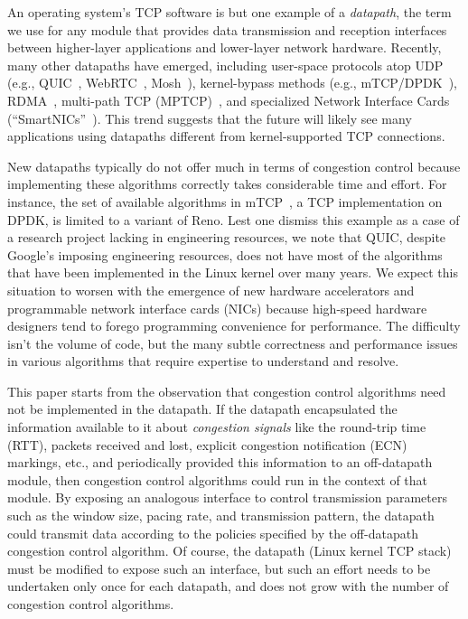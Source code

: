 An operating system's TCP software is but one example of a {\em datapath}, the term we use for any module that provides data transmission and reception interfaces between higher-layer applications and lower-layer network hardware. Recently, many other datapaths have emerged, including user-space protocols atop UDP (e.g., QUIC~\cite{quic}, WebRTC~\cite{webrtc}, Mosh~\cite{mosh}), kernel-bypass methods (e.g., mTCP/DPDK~\cite{dpdk,mtcp,netmap}), RDMA~\cite{dcqcn}, multi-path TCP (MPTCP)~\cite{mptcp}, and specialized Network Interface Cards (``SmartNICs''~\cite{smartnic}). This trend suggests that the future will likely see many applications using datapaths different from kernel-supported TCP connections.

New datapaths typically do not offer much in terms of congestion control because implementing these algorithms correctly takes considerable time and effort. For instance, the set of available algorithms in mTCP~\cite{mtcp}, a TCP implementation on DPDK, is limited to a variant of Reno. 
Lest one dismiss this example as a case of a research project lacking in engineering resources, we note that QUIC, despite Google's imposing engineering resources, does not have most of the algorithms that have been implemented in the Linux kernel over many years.  
We expect this situation to worsen with the emergence of new hardware accelerators and programmable network interface cards (NICs) because high-speed hardware designers tend to forego programming convenience for performance. The difficulty isn't the volume of code, but the many subtle correctness and performance issues in various algorithms that require expertise to understand and resolve.

This paper starts from the observation that congestion control algorithms need not be implemented in the datapath. If the datapath encapsulated the information available to it about {\em congestion signals} like the round-trip time (RTT), packets received and lost, explicit congestion notification (ECN) markings, etc., and periodically provided this information to an off-datapath module, then congestion control algorithms could run in the context of that module. By exposing an analogous interface to control transmission parameters such as the window size, pacing rate, and transmission pattern, the datapath could transmit data according to the policies specified by the off-datapath congestion control algorithm. Of course, the datapath (\eg Linux kernel TCP stack) must be modified to expose
such an interface, but such an effort needs to be undertaken only once for each datapath, and does not grow with the number of congestion control algorithms.

